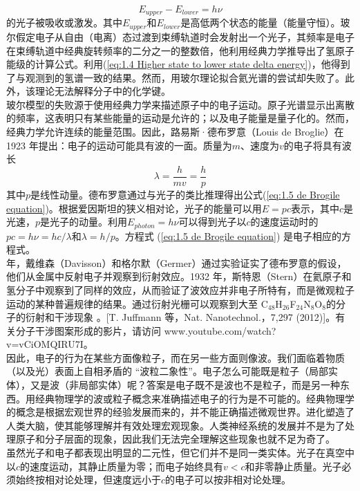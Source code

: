 	\begin{equation}
		\boxed{E_{upper}-E_{lower}=h\nu}
		\label{eq:1.4 Higher state to lower state delta energy}
	\end{equation}
	的光子被吸收或激发。其中$E_{upper}$和$E_{lower}$是高低两个状态的能量（能量守恒）。玻尔假定电子从自由（电离）态过渡到束缚轨道时会发射出一个光子，其频率是电子在束缚轨道中经典旋转频率的二分之一的整数倍，他利用经典力学推导出了氢原子能级的计算公式。利用(\ref{eq:1.4 Higher state to lower state delta energy})，他得到了与观测到的氢谱一致的结果。然而，用玻尔理论拟合氦光谱的尝试却失败了。此外，该理论无法解释分子中的化学键。\\
	\indent 玻尔模型的失败源于使用经典力学来描述原子中的电子运动。原子光谱显示出离散的频率，这表明只有某些能量的运动是允许的；以及电子能量是量子化的。然而，经典力学允许连续的能量范围。因此，路易斯·德布罗意（Louis de Broglie）在 1923 年提出：电子的运动可能具有波的一面。质量为$m$、速度为$v$的电子将具有波长
	\begin{equation}
		\lambda=\frac{h}{mv}=\frac{h}{p}
		\label{eq:1.5 de Brogile equation}
	\end{equation}
	其中$p$是线性动量。德布罗意通过与光子的类比推理得出公式(\ref{eq:1.5 de Brogile equation})。根据爱因斯坦的狭义相对论，光子的能量可以用$E=pc$表示，其中$c$是光速，$p$是光子的动量。利用$E_{photon}=h\nu$可以得到光子以$c$的速度运动时的$pc=h\nu =hc/\lambda$和$\lambda = h/p$。方程式 (\ref{eq:1.5 de Brogile equation}) 是电子相应的方程式。\\
	 年，戴维森（Davisson）和格尔默（Germer）通过实验证实了德布罗意的假设，他们从金属中反射电子并观察到衍射效应。1932 年，斯特恩（Stern）在氦原子和氢分子中观察到了同样的效应，从而验证了波效应并非电子所特有，而是微观粒子运动的某种普遍规律的结果。通过衍射光栅可以观察到大至 C$_{48}$H$_{26}$F$_{24}$N$_8$O$_8$的分子的衍射和干涉现象	。[T. Juffmann 等，Nat. Nanotechnol.，7,297 (2012)]。有关分子干涉图案形成的影片，请访问 www.youtube.com/watch?v=vCiOMQIRU7I。\\
	\indent 因此，电子的行为在某些方面像粒子，而在另一些方面则像波。我们面临着物质（以及光）表面上自相矛盾的 “波粒二象性”。电子怎么可能既是粒子（局部实体），又是波（非局部实体）呢？答案是电子既不是波也不是粒子，而是另一种东西。用经典物理学的波或粒子概念来准确描述电子的行为是不可能的。经典物理学的概念是根据宏观世界的经验发展而来的，并不能正确描述微观世界。进化塑造了人类大脑，使其能够理解并有效处理宏观现象。人类神经系统的发展并不是为了处理原子和分子层面的现象，因此我们无法完全理解这些现象也就不足为奇了。\\
	\indent 虽然光子和电子都表现出明显的二元性，但它们并不是同一类实体。光子在真空中以$c$的速度运动，其静止质量为零；而电子始终具有$v<c$和非零静止质量。光子必须始终按相对论处理，但速度远小于$c$的电子可以按非相对论处理。
	
